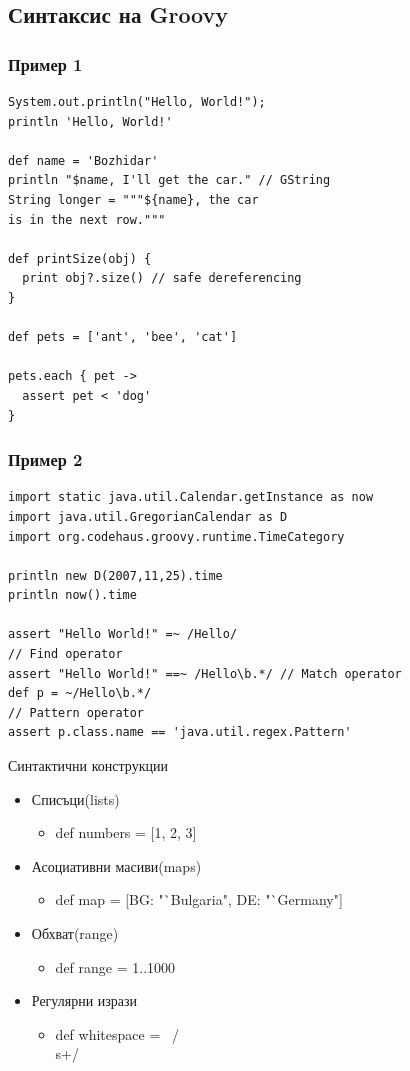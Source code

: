 \documentclass[compress,red]{beamer}
\begin{document}
\subsection{Синтаксис на Groovy}
\begin{frame}[fragile]
  \frametitle{Пример 1}
  \transdissolve
\begin{lstlisting}[basicstyle=\small]
System.out.println("Hello, World!");
println 'Hello, World!'
                       
def name = 'Bozhidar'
println "$name, I'll get the car." // GString
String longer = """${name}, the car
is in the next row."""

def printSize(obj) { 
  print obj?.size() // safe dereferencing
}
 
def pets = ['ant', 'bee', 'cat']

pets.each { pet ->
  assert pet < 'dog'
}
\end{lstlisting}
\end{frame}

\begin{frame}[fragile]
  \frametitle{Пример 2}
  \transdissolve
\begin{lstlisting}[basicstyle=\small ]
import static java.util.Calendar.getInstance as now
import java.util.GregorianCalendar as D
import org.codehaus.groovy.runtime.TimeCategory

println new D(2007,11,25).time
println now().time

assert "Hello World!" =~ /Hello/
// Find operator
assert "Hello World!" ==~ /Hello\b.*/ // Match operator
def p = ~/Hello\b.*/
// Pattern operator
assert p.class.name == 'java.util.regex.Pattern'
\end{lstlisting}
\end{frame}

\begin{frame}{Синтактични конструкции}
  \transdissolve
  \begin{itemize}
  \item Списъци(lists)
    \begin{itemize}
    \item def numbers = [1, 2, 3]      
    \end{itemize}
  \item Асоциативни масиви(maps)
    \begin{itemize}
    \item def map = [BG: "`Bulgaria", DE: "`Germany"]      
    \end{itemize}
  \item Обхват(range)
    \begin{itemize}
      \item def range = 1..1000
    \end{itemize}
  \item Регулярни изрази
    \begin{itemize}
      \item def whitespace = ~/\\s+/
    \end{itemize}
  \end{itemize}
\end{frame}
\end{document}
